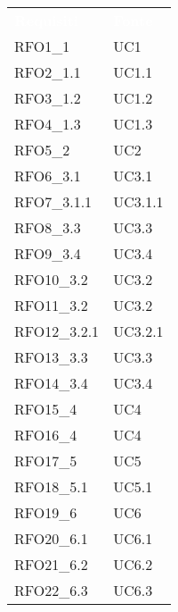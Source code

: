 \renewcommand{\arraystretch}{1.5}
\begin{longtable}{|C{6cm} C{3cm}|} 
	
	\textcolor{white}{\textbf{Requisiti}} &
	\textcolor{white}{\textbf{Fonte}} \\
	
	RFO1\_1 & UC1 \\

	RFO2\_1.1 & UC1.1 \\
	
	RFO3\_1.2 & UC1.2 \\
	
	RFO4\_1.3 & UC1.3 \\
	
	RFO5\_2 & UC2 \\

	RFO6\_3.1 & UC3.1 \\
	
	RFO7\_3.1.1 & UC3.1.1 \\

	RFO8\_3.3 & UC3.3 \\

	RFO9\_3.4 & UC3.4 \\

	RFO10\_3.2 & UC3.2 \\
	
	RFO11\_3.2 & UC3.2 \\
	
	RFO12\_3.2.1 & UC3.2.1 \\

	RFO13\_3.3 & UC3.3 \\

	RFO14\_3.4 & UC3.4 \\

    RFO15\_4 & UC4 \\
    
    RFO16\_4 & UC4 \\

    RFO17\_5 & UC5 \\
    
    RFO18\_5.1 & UC5.1 \\
    
    RFO19\_6 & UC6\\
    
    RFO20\_6.1 & UC6.1 \\
    
    RFO21\_6.2 & UC6.2 \\
    
    RFO22\_6.3 & UC6.3 \\
    

\end{longtable}
